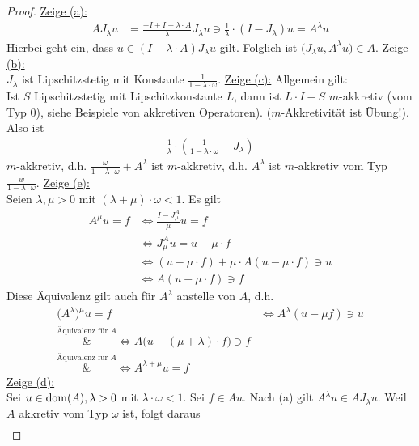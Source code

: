 \begin{proof}
	\underline{Zeige (a):}
	\begin{align*}
		A J_\lambda u
		&=\frac{-I+I+\lambda\cdot A}{\lambda}J_\lambda u
		\ni\frac{1}{\lambda}\cdot(I-J_\lambda)u
		=A^\lambda u
	\end{align*}
	Hierbei geht ein, dass $u\in(I+\lambda\cdot A)J_\lambda u$ gilt.
	Folglich ist $\big(J_\lambda u,A^\lambda u\big)\in A$.\nl
	\underline{Zeige (b):}\\
	$J_\lambda$ ist Lipschitzstetig mit Konstante $\frac{1}{1-\lambda\cdot\omega}$.\nl
	\underline{Zeige (c):}
	Allgemein gilt:\\
	Ist $S$ Lipschitzstetig mit Lipschitzkonstante $L$, dann ist $L\cdot I-S$ $m$-akkretiv (vom Typ 0), siehe Beispiele von akkretiven Operatoren). ($m$-Akkretivität ist Übung!). Also ist
	\begin{align*}
		\frac{1}{\lambda}\cdot\left(\frac{1}{1-\lambda\cdot\omega}-J_\lambda\right)
	\end{align*}
	$m$-akkretiv, d.h. $\frac{\omega}{1-\lambda\cdot\omega}+A^\lambda$ ist $m$-akkretiv, d.h. $A^\lambda$ ist $m$-akkretiv vom Typ $\frac{w}{1-\lambda\cdot\omega}$.\nl
	\underline{Zeige (e):}\\
	Seien $\lambda,\mu>0$ mit $(\lambda+\mu)\cdot\omega<1$.
	Es gilt
	\begin{align*}
		A^\mu u=f
		&\Longleftrightarrow \frac{I-J_\mu^A}{\mu} u=f\\
		&\Longleftrightarrow J_\mu^A u=u-\mu\cdot f\\
		&\Longleftrightarrow(u-\mu\cdot f)+\mu\cdot A(u-\mu\cdot f)\ni u\\
		&\Longleftrightarrow A(u-\mu\cdot f)\ni f
	\end{align*}
	Diese Äquivalenz gilt auch für $A^\lambda$ anstelle von $A$, d.h.
	\begin{align*}
		\big(A^\lambda)^\mu u=f
		&\Longleftrightarrow A^\lambda(u-\mu f)\ni u\\
		\overset{\text{Äquivalenz für }A}&{\Longleftrightarrow}
		A\big(u-(\mu+\lambda)\cdot f\big)\ni f\\
		\overset{\text{Äquivalenz für }A}&{\Longleftrightarrow}
		A^{\lambda+\mu} u=f
	\end{align*}
	\underline{Zeige (d):}\\
	Sei $u\in\operatorname{dom}(A),\lambda>0$ mit $\lambda\cdot\omega<1$.
	Sei $f\in A u$.
	Nach (a) gilt $A^\lambda u\in A J_\lambda u$.
	Weil $A$ akkretiv vom Typ $\omega$ ist, folgt daraus 
	\begin{align*}

\end{align*}
\end{proof}
